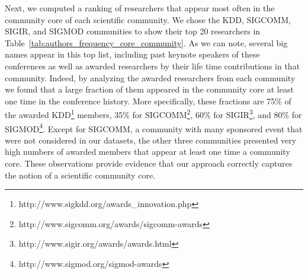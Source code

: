 Next, we computed a ranking of researchers that appear most often in the community core of each scientific community. We chose the KDD, SIGCOMM, SIGIR, and SIGMOD communities to
show their top 20 researchers in Table~\ref{tab:authors_frequency_core_community}.  As we can note, several big names appear in this top list, including past keynote speakers of
these conferences as well as awarded researchers by their life time contributions in that community. Indeed, by analyzing the awarded researchers from each community we found that
a large fraction of them appeared in the community core at least one time in the conference history. More specifically, these fractions are 75\% of the awarded
KDD\footnote{http://www.sigkdd.org/awards\_innovation.php} members, 35\% for SIGCOMM\footnote{http://www.sigcomm.org/awards/sigcomm-awards}, 60\% for
SIGIR\footnote{http://www.sigir.org/awards/awards.html}, and 80\% for SIGMOD\footnote{http://www.sigmod.org/sigmod-awards}.  Except for SIGCOMM, a community with many sponsored
event that were not considered in our datasets, the other three communities presented very high numbers of awarded members that appear at least one time a community core. These
observations provide evidence that our approach correctly captures the notion of a scientific community core.



